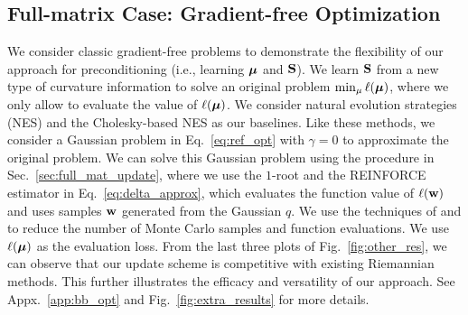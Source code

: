 \subsection{Full-matrix Case: Gradient-free Optimization}
\vspace{-0.15cm}
We consider classic gradient-free problems to demonstrate the flexibility of our approach for preconditioning (i.e., learning $\mbox{$\mbox{$\boldsymbol{\mu}$}$}$ and $\mbox{$\mbox{$\mathbf{S}$}$}$).
We learn $\mbox{$\mbox{$\mathbf{S}$}$}$ from a new type of curvature information to solve an original problem $\min_{\mu}\ell(\mbox{$\mbox{$\boldsymbol{\mu}$}$})$, where we only allow to
evaluate the value of $\ell(\mbox{$\mbox{$\boldsymbol{\mu}$}$})$.  We consider natural evolution strategies (NES) \citep{wierstra2008natural} and the Cholesky-based NES \citep{glasmachers2010exponential,fukushima2011proposal,lin2021tractable} as our baselines. Like these methods, we consider a Gaussian problem in Eq.~\eqref{eq:ref_opt} with $\gamma=0$ to approximate the original problem.
We can solve this Gaussian problem using the procedure in Sec.~\ref{sec:full_mat_update},
where we use the $1$-root and the REINFORCE estimator in Eq.~\eqref{eq:delta_approx}, which evaluates the function value of $\ell(\mbox{$\mbox{$\mathbf{w}$}$})$ and uses samples $\mbox{$\mbox{$\mathbf{w}$}$}$ generated from the Gaussian $q$. We use the techniques of  \citet{wierstra2008natural} and \citet{fukushima2011proposal} to reduce the number of Monte Carlo samples and function evaluations.
We use $\ell(\mbox{$\mbox{$\boldsymbol{\mu}$}$})$ as the evaluation loss.
From the last three plots of Fig.~\ref{fig:other_res}, we can observe that our update scheme is competitive with existing Riemannian methods. This further illustrates the efficacy and versatility of our approach. See Appx.~\ref{app:bb_opt} and Fig.~\ref{fig:extra_results} for more details.

  


\vspace{-0.2cm}
